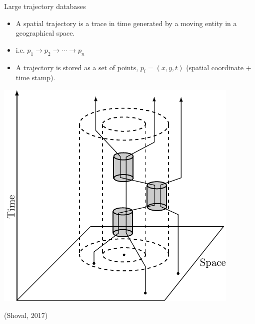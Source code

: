 \documentclass{beamer}
\begin{document}
    \begin{frame}{Large trajectory databases}
        \begin{minipage}{0.59\textwidth}
            \begin{itemize}
                \item A spatial trajectory is a trace in time generated by a moving entity in a geographical space.
                \item i.e. $p_1 \rightarrow p_2 \rightarrow \cdots \rightarrow p_n$
                \item A trajectory is stored as a set of points, $p_i = (x, y, t)$ (spatial coordinate + time stamp).
            \end{itemize}
        \end{minipage}\hfill %
        \begin{minipage}{0.4\textwidth}
            \includegraphics[width=\textwidth]{figures/trajectory}
            \begin{flushright}
                {\tiny (Shoval, 2017)}
            \end{flushright}
        \end{minipage}
    \end{frame}
\end{document}
